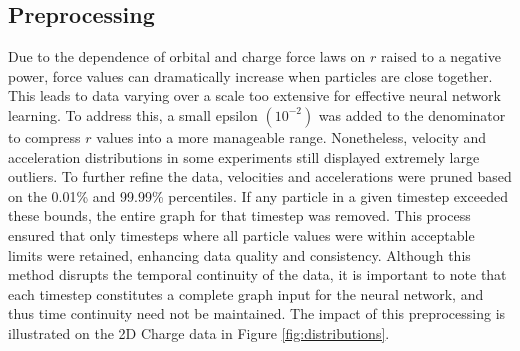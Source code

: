 \documentclass[11pt]{article}
\begin{document}
\subsection{Preprocessing}
Due to the dependence of orbital and charge force laws on \(r\) raised to a negative power, force values can dramatically increase when particles are close together. This leads to data varying over a scale too extensive for effective neural network learning. To address this, a small epsilon \((10^{-2})\) was added to the denominator to compress \(r\) values into a more manageable range. Nonetheless, velocity and acceleration distributions in some experiments still displayed extremely large outliers. To further refine the data, velocities and accelerations were pruned based on the 0.01\% and 99.99\% percentiles. If any particle in a given timestep exceeded these bounds, the entire graph for that timestep was removed. This process ensured that only timesteps where all particle values were within acceptable limits were retained, enhancing data quality and consistency. Although this method disrupts the temporal continuity of the data, it is important to note that each timestep constitutes a complete graph input for the neural network, and thus time continuity need not be maintained. The impact of this preprocessing is illustrated on the 2D Charge data in Figure \ref{fig:distributions}.
\end{document}
